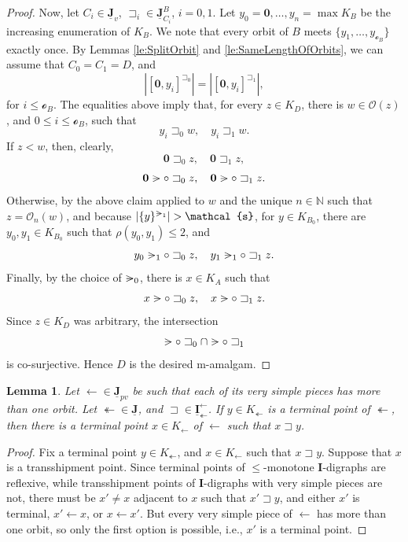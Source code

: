 \documentclass[12pt]{amsart}
\numberwithin{equation}{section}
\theoremstyle{plain}
\newtheorem{lemma}[theorem]{Lemma}
\theoremstyle{definition}
\newcommand{\nil}{\mathrel{\vphantom{>}\text{\mathsurround=0pt\ooalign{$>$\cr$-$\cr}}}}
\newcommand \sqsp{\sqsupset}
\newcommand \la{\leftarrow}
\newcommand \tla{\twoheadleftarrow}
\newcommand \rt{\mathbf{0}}
\newcommand \IIb{\mathbf{I}}
\newcommand \JJub{\underline{\mathbf{J}}}
\newcommand \OO{\mathcal{O}}
\newcommand \oo{\mathcal{o}}
\newcommand \sss{\mathcal{s}}
\newcommand \NN{\mathbb{N}}
\begin{document}
\begin{proof}
Now, let  ${C_i} \in \JJub_v$, $\sqsp_i \in \JJub^{B}_{C_i}$, $i=0,1$.  Let $y_0=\rt, \ldots, y_n=\max K_{B}$ be the increasing enumeration of $K_{B}$. We note that every orbit of $B$ meets  $\{ y_1, \ldots, y_{\oo_{B}} \}$ exactly once. By Lemmas \ref{le:SplitOrbit} and \ref{le:SameLengthOfOrbits}, we can assume that $C_0=C_1=D$, and $$|[\rt,y_i]^{\sqsp_0}|=|[\rt,y_i]^{\sqsp_1}|,$$ for $i \leq \oo_{B}$. 
%
%
The equalities above imply that, for every $z \in K_D$, there is $w \in \OO(z)$, and $0 \leq i \leq \oo_{B}$, such that $$y_i \sqsp_0 w, \quad y_i \sqsp_1 w.$$  If $z<w$, then, clearly, $$\rt \sqsp_0 z, \quad \rt \sqsp_1 z,$$
%
$$\rt \nil \circ \sqsp_0 z, \quad \rt \nil \circ \sqsp_1 z.$$
%
Otherwise, by the above claim applied to $w$ and the unique $n \in \NN$ such that $z=\OO_n(w)$, and because $|\{y\}^{\nil_1} |>\sss$, for $y \in K_{B_0}$, %
%
there are $y_0,y_1 \in K_{B_0}$ such that $\rho(y_0,y_1) \leq 2$, and $$y_0 \nil_1 \circ \sqsp_0 z, \quad y_1 \nil_1 \circ \sqsp_1 z.$$
%
Finally, by the choice of $\nil_0$, there is $x \in K_A$ such that $$x \nil \circ \sqsp_0 z, \quad x \nil \circ \sqsp_1 z.$$ 
%
Since $z \in K_D$ was arbitrary, the intersection  $$\nil \circ \sqsp_0 \cap \nil \circ \sqsp_1$$ is co-surjective. Hence $D$ is the desired m-amalgam.
\end{proof}


\begin{lemma}
	\label{le:TerminalAreStable}
	Let $\leftarrow \in \JJub_{pv}$ be such that each of its very simple pieces has more than one orbit. Let ${\twoheadleftarrow} \in \JJub$, and $\sqsp \in \underline{\mathbf{I}}_\twoheadleftarrow^\leftarrow$. If $y \in K_\tla$ is a terminal point of $\tla$, then there is a terminal point $x \in K_\la$ of $\la$ such that $x \sqsp y$.    
\end{lemma}

\begin{proof}
	Fix a terminal point $y \in K_\twoheadleftarrow$, and  $x \in K_\leftarrow$ such that $x \sqsp y$. Suppose that $x$ is a transshipment point. Since terminal points of
	$\leq$-monotone $\IIb$-digraphs are reflexive, while transshipment
	points of $\IIb$-digraphs with very simple pieces are not, there must
	be $x'\neq x$ adjacent to $x$ such that $x'\sqsp y$, and either $x'$
	is terminal, $x'\la x$, or $x\la x'$. But every very simple piece of $\la$ has more than one orbit, so only the first option is possible, i.e., $x'$ is  a terminal point.
\end{proof}
\end{document}
